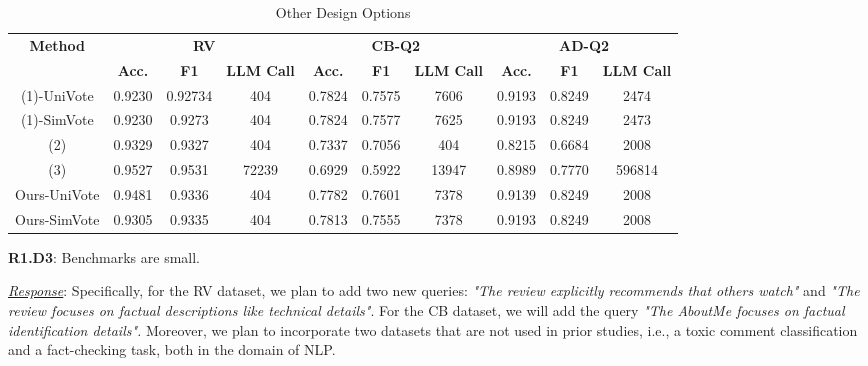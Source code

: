 \documentclass[sigconf]{acmart}
\begin{document}
\begin{table}[t]
    \centering
    \tiny
    \caption{Other Design Options}
    \vspace{-2ex}
    \label{response:tab:options}
    \setlength{\tabcolsep}{3pt}
    \begin{tabular}{c|ccc|ccc|ccc}
    \toprule
    \multirow{2}{*}{\bf Method} & \multicolumn{3}{c}{\textbf{RV}} & \multicolumn{3}{c}{\textbf{CB-Q2}} & \multicolumn{3}{c}{\textbf{AD-Q2}} \\
    \cmidrule(lr){2-4} \cmidrule(lr){5-7} \cmidrule(lr){8-10}
    & \textbf{Acc.} & \textbf{F1} &\textbf{LLM Call} & \textbf{Acc.} & \textbf{F1} & \textbf{LLM Call} & \textbf{Acc.} & \textbf{F1} & \textbf{LLM Call} \\
    \midrule
    (1)-UniVote & 0.9230 & 0.92734 & 404 & 0.7824 & 0.7575 & 7606 & 0.9193 & 0.8249 & 2474 \\
    (1)-SimVote & 0.9230 & 0.9273 & 404 & 0.7824 & 0.7577 & 7625 & 0.9193 & 0.8249 & 2473 \\
    (2) & 0.9329 & 0.9327 & 404 & 0.7337 & 0.7056 & 404 & 0.8215 & 0.6684 & 2008 \\
    (3) & 0.9527 & 0.9531 & 72239 & 0.6929 & 0.5922 & 13947 & 0.8989 & 0.7770 & 596814 \\
    Ours-UniVote & 0.9481 & 0.9336 & 404 & 0.7782 & 0.7601 & 7378 & 0.9139 & 0.8249 & 2008 \\
    Ours-SimVote & 0.9305 & 0.9335 & 404 & 0.7813 & 0.7555 & 7378 & 0.9193 & 0.8249 & 2008 \\
    \bottomrule
    \end{tabular}
\end{table}


{\noindent \textbf{R1.D3}}: Benchmarks are small.

{\noindent \underline{\sl Response}:}
 Specifically, for the RV dataset, we plan to add two new queries: \textit{"The review explicitly recommends that others watch"} and \textit{"The review focuses on factual descriptions like technical details"}. For the CB dataset, we will add the query \textit{"The AboutMe focuses on factual identification details".} 
Moreover, we plan to incorporate two datasets that are not used in prior studies, i.e., a toxic comment classification and a fact-checking task, both in the domain of NLP. 
\end{document}
